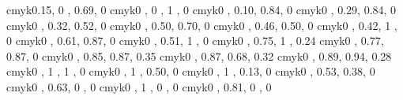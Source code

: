 %
%

\definecolor{greenyellow}   {cmyk}{0.15, 0   , 0.69, 0   }
\definecolor{yellow}        {cmyk}{0   , 0   , 1   , 0   }
\definecolor{goldenrod}     {cmyk}{0   , 0.10, 0.84, 0   }
\definecolor{dandelion}     {cmyk}{0   , 0.29, 0.84, 0   }
\definecolor{apricot}       {cmyk}{0   , 0.32, 0.52, 0   }
\definecolor{peach}         {cmyk}{0   , 0.50, 0.70, 0   }
\definecolor{melon}         {cmyk}{0   , 0.46, 0.50, 0   }
\definecolor{yelloworange}  {cmyk}{0   , 0.42, 1   , 0   }
\definecolor{orange}        {cmyk}{0   , 0.61, 0.87, 0   }
\definecolor{burntorange}   {cmyk}{0   , 0.51, 1   , 0   }
\definecolor{bittersweet}   {cmyk}{0   , 0.75, 1   , 0.24}
\definecolor{redorange}     {cmyk}{0   , 0.77, 0.87, 0   }
\definecolor{mahogany}      {cmyk}{0   , 0.85, 0.87, 0.35}
\definecolor{maroon}        {cmyk}{0   , 0.87, 0.68, 0.32}
\definecolor{brickred}      {cmyk}{0   , 0.89, 0.94, 0.28}
\definecolor{red}           {cmyk}{0   , 1   , 1   , 0   }
\definecolor{orangered}     {cmyk}{0   , 1   , 0.50, 0   }
\definecolor{rubinered}     {cmyk}{0   , 1   , 0.13, 0   }
\definecolor{salmon}        {cmyk}{0   , 0.53, 0.38, 0   }
\definecolor{carnationpink} {cmyk}{0   , 0.63, 0   , 0   }
\definecolor{magenta}       {cmyk}{0   , 1   , 0   , 0   }
\definecolor{violetred}     {cmyk}{0   , 0.81, 0   , 0   }
